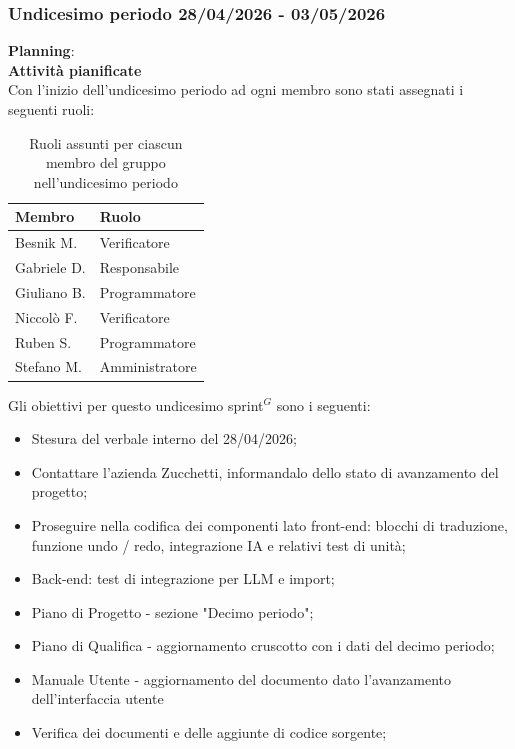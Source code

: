 \documentclass[a4paper,10pt]{article}
\begin{document}
\subsubsection{Undicesimo periodo 28/04/2026 - 03/05/2026}
\textbf{Planning}: \\
\textbf{Attività pianificate} \\ Con l'inizio dell'undicesimo periodo ad ogni membro sono stati assegnati i seguenti ruoli:
\begin{table}[H]
\centering
\begin{tabular}{|l|l|}
\hline
\textbf{Membro} & \textbf{Ruolo} \\
\hline
Besnik M.  & Verificatore \\
\hline
Gabriele D.  & Responsabile \\
\hline
Giuliano B. & Programmatore \\
\hline
Niccolò F. & Verificatore \\
\hline
Ruben S. & Programmatore \\
\hline
Stefano M.  & Amministratore \\
\hline
\end{tabular}
\caption{Ruoli assunti per ciascun membro del gruppo nell'undicesimo periodo}
\end{table}

Gli obiettivi per questo undicesimo sprint$^G$ sono i seguenti:
\begin{itemize}
  \item Stesura del verbale interno del 28/04/2026;
  \item Contattare l'azienda Zucchetti, informandalo dello stato di avanzamento del progetto;
  \item Proseguire nella codifica dei componenti lato front-end: blocchi di traduzione, funzione undo / redo, integrazione IA e relativi test di unità;
  \item Back-end: test di integrazione per LLM e import;
  \item Piano di Progetto - sezione "Decimo periodo";
  \item Piano di Qualifica - aggiornamento cruscotto con i dati del decimo periodo;
  \item Manuale Utente - aggiornamento del documento dato l'avanzamento dell'interfaccia utente
  \item Verifica dei documenti e delle aggiunte di codice sorgente;
\end{itemize}
\end{document}
